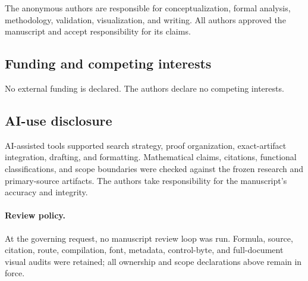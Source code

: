 The anonymous authors are responsible for conceptualization, formal
analysis, methodology, validation, visualization, and writing.  All authors
approved the manuscript and accept responsibility for its claims.

\subsection{Funding and competing interests}

No external funding is declared.  The authors declare no competing
interests.

\subsection{AI-use disclosure}

AI-assisted tools supported search strategy, proof organization,
exact-artifact integration, drafting, and formatting.  Mathematical claims,
citations, functional classifications, and scope boundaries were checked
against the frozen research and primary-source artifacts.  The authors take
responsibility for the manuscript's accuracy and integrity.

\paragraph{Review policy.}
At the governing request, no manuscript review loop was run.  Formula,
source, citation, route, compilation, font, metadata, control-byte, and
full-document visual audits were retained; all ownership and scope
declarations above remain in force.
